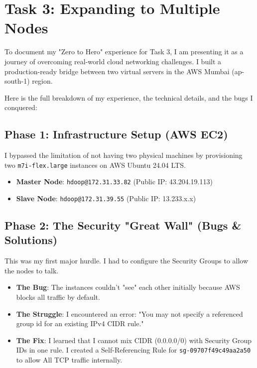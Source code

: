 \documentclass{article}
\begin{document}
\section*{Task 3: Expanding to Multiple Nodes}

To document my "Zero to Hero" experience for Task 3, I am presenting it as a journey of overcoming real-world cloud networking challenges. I built a production-ready bridge between two virtual servers in the AWS Mumbai (ap-south-1) region.

Here is the full breakdown of my experience, the technical details, and the bugs I conquered:

\subsection*{Phase 1: Infrastructure Setup (AWS EC2)}
I bypassed the limitation of not having two physical machines by provisioning two \texttt{m7i-flex.large} instances on AWS Ubuntu 24.04 LTS.
\begin{itemize}
    \item \textbf{Master Node}: \texttt{hdoop@172.31.33.82} (Public IP: 43.204.19.113)
    \item \textbf{Slave Node}: \texttt{hdoop@172.31.39.55} (Public IP: 13.233.x.x)
\end{itemize}

\subsection*{Phase 2: The Security "Great Wall" (Bugs \& Solutions)}
This was my first major hurdle. I had to configure the Security Groups to allow the nodes to talk.
\begin{itemize}
    \item \textbf{The Bug}: The instances couldn't "see" each other initially because AWS blocks all traffic by default.
    \item \textbf{The Struggle}: I encountered an error: "You may not specify a referenced group id for an existing IPv4 CIDR rule."
    \item \textbf{The Fix}: I learned that I cannot mix CIDR (0.0.0.0/0) with Security Group IDs in one rule. I created a Self-Referencing Rule for \texttt{sg-09707f49c49aa2a50} to allow All TCP traffic internally.
\end{itemize}
\end{document}

